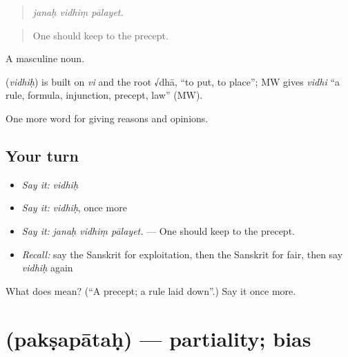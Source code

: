 \begin{quote}
  
\end{quote}

\begin{quote}
\emph{janaḥ vidhiṃ pālayet.}
\end{quote}

\begin{quote}
One should keep to the precept.
\end{quote}

A masculine noun.

\begin{cousinweb}
\textbf{} (\emph{vidhiḥ}) is built on \emph{vi} and the root √dhā, \textquotedblleft{}to put, to place\textquotedblright{}; MW gives \emph{vidhi} \textquotedblleft{}a rule, formula, injunction, precept, law\textquotedblright{} (MW).
\end{cousinweb}

\begin{grammarlens}[title={What you've built}]
One more word for giving reasons and opinions.
\end{grammarlens}

\subsection*{Your turn}
\begin{itemize}
\raggedright
  \item \emph{Say it:} \emph{vidhiḥ}
  \item \emph{Say it:} \emph{vidhiḥ}, once more
  \item \emph{Say it:} \emph{janaḥ vidhiṃ pālayet.} — One should keep to the precept.
  \item \emph{Recall:} say the Sanskrit for exploitation, then the Sanskrit for fair, then say \emph{vidhiḥ} again
\end{itemize}

\begin{tcolorbox}[breakable,colback=teal!4,colframe=teal!35!black,title={Before you move on}]
What does  mean? (\textquotedblleft{}A precept; a rule laid down\textquotedblright{}.) Say it once more.
\end{tcolorbox}
\section[\texorpdfstring{\sk{पक्षपातः} (pakṣapātaḥ)}{पक्षपातः (pakṣapātaḥ)}]{ (pakṣapātaḥ) — partiality; bias}

